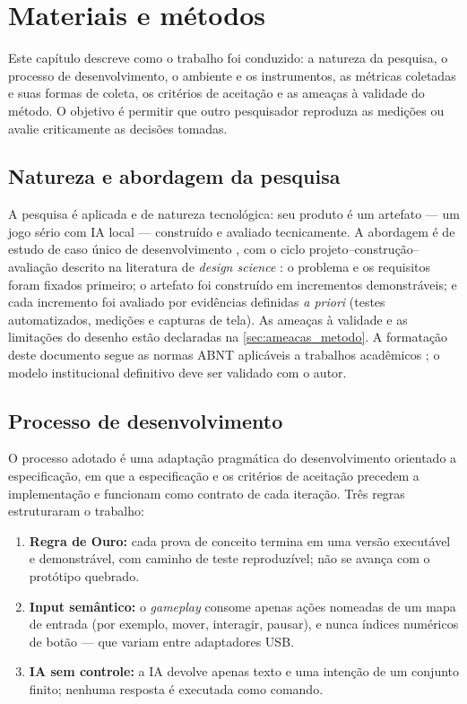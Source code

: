 \chapter{Materiais e métodos}
\label{cap:metodos}

Este capítulo descreve como o trabalho foi conduzido: a natureza da pesquisa,
o processo de desenvolvimento, o ambiente e os instrumentos, as métricas
coletadas e suas formas de coleta, os critérios de aceitação e as ameaças à
validade do método. O objetivo é permitir que outro pesquisador reproduza as
medições ou avalie criticamente as decisões tomadas.

\section{Natureza e abordagem da pesquisa}
\label{sec:natureza}

A pesquisa é aplicada e de natureza tecnológica: seu produto é um artefato
--- um jogo sério com IA local --- construído e avaliado tecnicamente. A
abordagem é de estudo de caso único de desenvolvimento
\cite{yin2015casestudy}, com o ciclo projeto--construção--avaliação descrito
na literatura de \emph{design science} \cite{hevner2004design}: o problema e
os requisitos foram fixados primeiro; o artefato foi construído em incrementos
demonstráveis; e cada incremento foi avaliado por evidências definidas \emph{a
priori} (testes automatizados, medições e capturas de tela). As ameaças à
validade e as limitações do desenho estão declaradas na
\autoref{sec:ameacas_metodo}. A formatação deste documento segue as normas
ABNT aplicáveis a trabalhos acadêmicos \cite{nbr14724,nbr10520,nbr6023}; o
modelo institucional definitivo deve ser validado com o autor.

\section{Processo de desenvolvimento}
\label{sec:processo}

O processo adotado é uma adaptação pragmática do desenvolvimento orientado a
especificação, em que a especificação e os critérios de aceitação precedem a
implementação e funcionam como contrato de cada iteração. Três regras
estruturaram o trabalho:

\begin{enumerate}
  \item \textbf{Regra de Ouro:} cada prova de conceito termina em uma versão
  executável e demonstrável, com caminho de teste reproduzível; não se avança
  com o protótipo quebrado.
  \item \textbf{Input semântico:} o \emph{gameplay} consome apenas ações
  nomeadas de um mapa de entrada (por exemplo, mover, interagir, pausar), e
  nunca índices numéricos de botão --- que variam entre adaptadores USB.
  \item \textbf{IA sem controle:} a IA devolve apenas texto e uma intenção de
  um conjunto finito; nenhuma resposta é executada como comando.
\end{enumerate}

